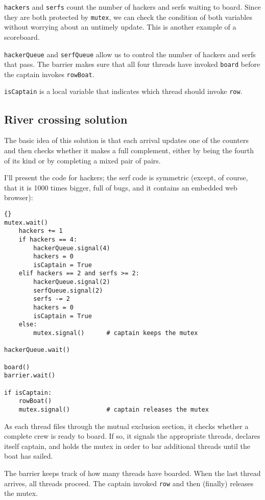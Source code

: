 \documentclass{book}
\newcommand{\clearemptydoublepage}{\newpage\cleardoublepage}
\begin{document}
{\tt hackers} and {\tt serfs} count the number of hackers
and serfs waiting to board.  Since they are both protected by
{\tt mutex}, we can check the condition of both variables without
worrying about an untimely update.  This is another example
of a scoreboard.

{\tt hackerQueue} and {\tt serfQueue} allow us to control the number
of hackers and serfs that pass.  The barrier
makes sure that all four threads have invoked
{\tt board} before the captain invokes {\tt rowBoat}.

{\tt isCaptain} is a local variable that
indicates which thread should invoke {\tt row}.

\clearemptydoublepage
\subsection {River crossing solution}

The basic idea of this solution is that each arrival updates
one of the counters and then checks whether it makes a
full complement, either by being the fourth of its kind or
by completing a mixed pair of pairs.

I'll present the code for hackers; the serf code is
symmetric (except, of course, that it is 1000 times bigger,
full of bugs, and it contains an embedded web browser):

\begin{lstlisting}[title={River crossing solution}]{}
mutex.wait()
    hackers += 1
    if hackers == 4:
        hackerQueue.signal(4)                
        hackers = 0
        isCaptain = True
    elif hackers == 2 and serfs >= 2:
        hackerQueue.signal(2)                
        serfQueue.signal(2)                  
        serfs -= 2
        hackers = 0
        isCaptain = True
    else:
        mutex.signal()      # captain keeps the mutex

hackerQueue.wait()           

board()
barrier.wait()            

if isCaptain:
    rowBoat()
    mutex.signal()          # captain releases the mutex
\end{lstlisting}

As each thread files through the mutual exclusion section, it
checks whether a complete crew is ready to board.  If so, it
signals the appropriate threads, declares itself captain, and
holds the mutex in order to bar additional threads until the
boat has sailed.

The barrier keeps track of how many threads have boarded.
When the last thread arrives, all threads proceed.
The captain invoked {\tt row} and then (finally) releases the mutex.
\end{document}
